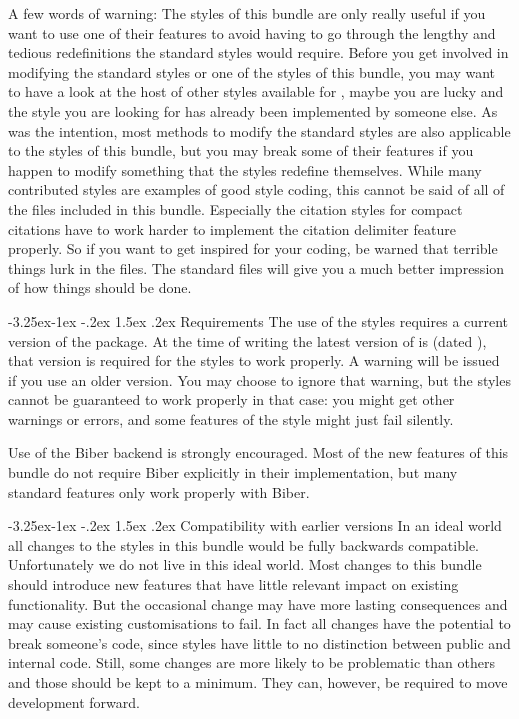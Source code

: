 \documentclass[11pt,a4paper]{article}
\makeatletter
\let\accentcolour\spotcolor
\newcommand*{\allsectionsfont}{\sffamily\accentcolour}
\renewcommand\subsection{\@startsection{subsection}{2}{\z@}%
                                       {-3.25ex\@plus -1ex \@minus -.2ex}%
                                       {1.5ex \@plus .2ex}%
                                       {\normalfont\large\bfseries\allsectionsfont}}
\newcommand*{\biblatexversion}{\extblx@requiredbiblatexversion}
\newcommand*{\biblatexdate}{\extblx@requiredbiblatexdate}
\newcommand*{\biber}{Biber}
\makeatother
\begin{document}
A few words of warning:
The styles of this bundle are only really useful if you want to use one of their
features to avoid having to go through the lengthy and tedious redefinitions the
standard styles would require.
Before you get involved in modifying the standard styles or one of the styles
of this bundle, you may want to have a look at the host of other styles
available for ,
maybe you are lucky and the style you are looking for has already been
implemented by someone else.
As was the intention, most methods to modify the standard styles are also
applicable to the styles of this bundle, but you may break some of their
features if you happen to modify something that the  styles
redefine themselves.
While many contributed  styles are examples of good 
style coding, this cannot be said of all of the files included in this bundle.
Especially the citation styles for compact citations have to work harder
to implement the citation delimiter feature properly.
So if you want to get inspired for your  coding, be warned that
terrible things lurk in the  files.
The standard  files will give you a much better impression of how
things should be done.


\subsection{Requirements}\label{sec:req}
The use of the styles requires a current version of the  package.
At the time of writing the latest version of  is
\biblatexversion{} (dated \biblatexdate),
that version is required for the styles to work properly.
A warning will be issued if you use an older version.
You may choose to ignore that warning, but the styles cannot be guaranteed to
work properly in that case:
you might get other warnings or errors, and some features of the style might
just fail silently.

Use of the \biber{} backend is strongly encouraged.
Most of the new features of this bundle do not require \biber{} explicitly in
their implementation, but many  standard features only work
properly with \biber{}.

\subsection{Compatibility with earlier versions}\label{sec:backw}
In an ideal world all changes to the styles in this bundle would be fully
backwards compatible. Unfortunately we do not live in this ideal world.
Most changes to this bundle should introduce new features that have little
relevant impact on existing functionality. But the occasional change
may have more lasting consequences and may cause existing customisations to
fail.
In fact all changes have the potential to break someone's code, since
 styles have little to no distinction between public and internal
code.
Still, some changes are more likely to be problematic than others and those
should be kept to a minimum. They can, however, be required to move development
forward.
\end{document}
